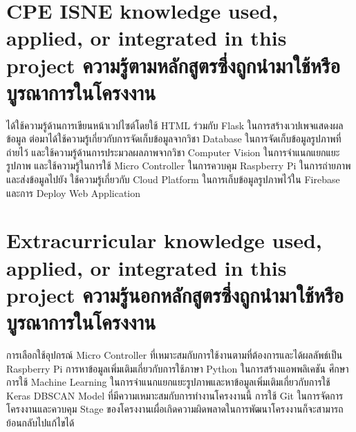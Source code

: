 




\section{\ifenglish%
\ifcpe CPE \else ISNE \fi knowledge used, applied, or integrated in this project
\else%
ความรู้ตามหลักสูตรซึ่งถูกนำมาใช้หรือบูรณาการในโครงงาน
\fi
}

ได้ใช้ความรู้ด้านการเขียนหน้าเวปไซต์โดยใช้ HTML ร่วมกับ Flask ในการสร้างเวปเพจแสดงผลข้อมูล ต่อมาได้ใช้ความรู้เกี่ยวกับการจัดเก็บข้อมูลจากวิชา Database ในการจัดเก็บข้อมูลรูปภาพที่ถ่ายไว้
\enskip และใช้ความรู้ด้านการประมวลผลภาพจากวิชา Computer Vision ในการจำแนกแยกแยะรูปภาพ และใช้ความรู้ในการใช้ Micro Controller ในการควบคุม Raspberry Pi ในการถ่ายภาพและส่งข้อมูลไปยัง
\enskip ใช้ความรู้เกี่ยวกับ Cloud Platform ในการเก็บข้อมูลรูปภาพไว้ใน Firebase และการ Deploy Web Application 

\section{\ifenglish%
Extracurricular knowledge used, applied, or integrated in this project
\else%
ความรู้นอกหลักสูตรซึ่งถูกนำมาใช้หรือบูรณาการในโครงงาน
\fi
}

การเลือกใช้อุปกรณ์ Micro Controller ที่เหมาะสมกับการใช้งานตามที่ต้องการและได้ผลลัพธ์เป็น Raspberry Pi การหาข้อมูลเพิ่มเติมเกี่ยวกับการใช้ภาษา Python ในการสร้างแอพพลิเคชัน
\enskip ศึกษาการใช้ Machine Learning ในการจำแนกแยกแยะรูปภาพและหาข้อมูลเพิ่มเติมเกี่ยวกับการใช้ Keras DBSCAN Model ที่มีความเหมาะสมกับการทำงานโครงงานนี้
\enskip การใช้ Git ในการจัดการโครงงานและควบคุม Stage ของโครงงานเผื่อเกิดความผิดพลาดในการพัฒนาโครงงานก็จะสามารถย้อนกลับไปแก้ไขได้